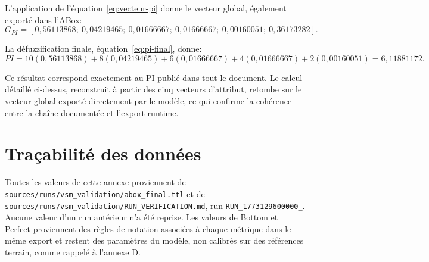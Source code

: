 L'application de l'équation~\ref{eq:vecteur-pi} donne le vecteur global, également exporté dans l'ABox:
\begin{equation}
G_{PI} = [0{,}56113868;\ 0{,}04219465;\ 0{,}01666667;\ 0{,}01666667;\ 0{,}00160051;\ 0{,}36173282].
\label{eq:exemple-pi-vecteur}
\end{equation}

La défuzzification finale, équation~\ref{eq:pi-final}, donne:
{\small
\begin{equation}
PI = 10(0{,}56113868) + 8(0{,}04219465) + 6(0{,}01666667) + 4(0{,}01666667) + 2(0{,}00160051) = 6{,}11881172.
\label{eq:exemple-pi-final}
\end{equation}
}

Ce résultat correspond exactement au PI publié dans tout le document. Le calcul détaillé ci-dessus, reconstruit à partir des cinq vecteurs d'attribut, retombe sur le vecteur global exporté directement par le modèle, ce qui confirme la cohérence entre la chaîne documentée et l'export runtime.

\section{Traçabilité des données}

Toutes les valeurs de cette annexe proviennent de \texttt{sources/\allowbreak runs/\allowbreak vsm\_validation/\allowbreak abox\_final.ttl} et de \texttt{sources/\allowbreak runs/\allowbreak vsm\_validation/\allowbreak RUN\_\allowbreak VERIFICATION.md}, run \texttt{RUN\_1773129600000\_}. Aucune valeur d'un run antérieur n'a été reprise. Les valeurs de Bottom et Perfect proviennent des règles de notation associées à chaque métrique dans le même export et restent des paramètres du modèle, non calibrés sur des références terrain, comme rappelé à l'annexe D.

